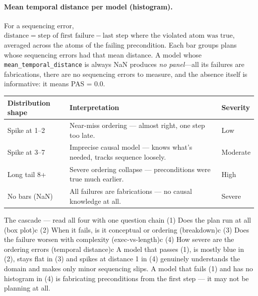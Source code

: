 \paragraph{Mean temporal distance per model (histogram).}

For a sequencing error,
\(\mathrm{distance}
= \text{step of first failure}
- \text{last step where the violated atom was true}\),
averaged across the atoms of the failing precondition. Each bar groups plans
whose sequencing errors had that mean distance. A model whose
\texttt{mean\_\allowbreak temporal\_\allowbreak distance} is always NaN
produces \emph{no panel}---all its failures are fabrications, there are no
sequencing errors to measure, and the absence itself is informative: it means
PAS = 0.0.

\begin{table}[h]\small
\centering
\begin{tabularx}{\linewidth}{@{}Y I P@{}}
\toprule
Distribution shape & Interpretation & Severity\\
\midrule
Spike at 1--2 & Near-miss ordering --- almost right, one step too late. & Low\\
\addlinespace
Spike at 3--7 & Imprecise causal model --- knows what's needed, tracks sequence loosely. & Moderate\\
\addlinespace
Long tail 8+ & Severe ordering collapse --- preconditions were true much earlier. & High\\
\addlinespace
No bars (NaN) & All failures are fabrications --- no causal knowledge at all. & Severe\\
\bottomrule
\end{tabularx}
\end{table}

\begin{bmkeybox}{The cascade --- read all four with one question chain}
(1) Does the plan run at all (box plot)c (2) When it fails, is it conceptual or ordering (breakdown)c (3) Does the failure worsen with complexity (exec-vs-length)c (4) How severe are the ordering errors (temporal distance)c A model that passes (1), is mostly blue in (2), stays flat in (3) and spikes at distance 1 in (4) genuinely understands the domain and makes only minor sequencing slips. A model that fails (1) and has no histogram in (4) is fabricating preconditions from the first step --- it may not be planning at all.
\end{bmkeybox}
